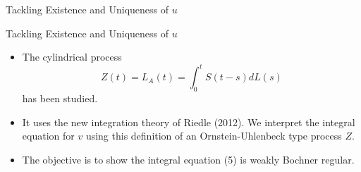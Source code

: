 \documentclass[xcolor=dvipsnames,leqno]{beamer}
\newtheorem{defn}{Definition}
\begin{document}
\begin{frame}{Tackling Existence and Uniqueness of $u$}
\begin{itemize}
	\end{itemize}
\end{frame}
\begin{frame}{Tackling Existence and Uniqueness of $u$}
	\begin{itemize}
		\item The cylindrical process
	\[
		Z(t)=L_A(t)=\int_{0}^{t}S(t-s)dL(s)
	\]has been studied.
		\item It uses the new integration theory of Riedle (2012). We interpret the integral equation for $v$ using this definition of an Ornstein-Uhlenbeck type process $Z$.
		\item  The objective is to show the integral equation (5) is weakly Bochner regular.
	\end{itemize}	
\end{frame}   
 
\end{document}
